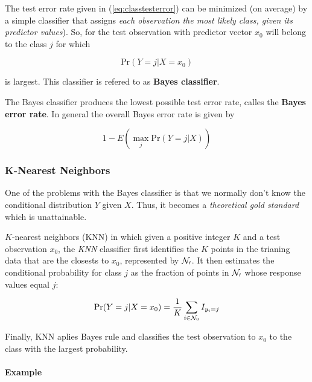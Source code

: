 \documentclass[11pt]{article}
\begin{document}
The test error rate given in (\ref{eq:classtesterror}) can be minimized
(on average) by a simple classifier that assigns \emph{each observation
the most likely class, given its predictor values}). So, for the test
observation with predictor vector \(x_0\) will belong to the class \(j\)
for which

\begin{equation*}
\mathrm{Pr}(Y=j | X=x_0)
\end{equation*}

is largest. This classifier is refered to as \textbf{Bayes classifier}.

The Bayes classifier produces the lowest possible test error rate,
calles the \textbf{Bayes error rate}. In general the overall Bayes error
rate is given by

\begin{equation*}
1 - E \left( \max_{j} \mathrm{Pr}(Y=j|X) \right)
\end{equation*}

\hypertarget{k-nearest-neighbors}{%
\subsubsection{K-Nearest Neighbors}\label{k-nearest-neighbors}}

One of the problems with the Bayes classifier is that we normally don't
know the conditional distribution \(Y\) given \(X\). Thus, it becomes a
\emph{theoretical gold standard} which is unattainable.

\(K\)-nearest neighbors (KNN) in which given a positive integer \(K\)
and a test observation \(x_0\), the \emph{KNN} classifier first
identifies the \(K\) points in the trianing data that are the closests
to \(x_0\), represented by \(\cal{N}_0\). It then estimates the
conditional probability for class \(j\) as the fraction of points in
\(\cal{N}_0\) whose response values equal \(j\):

\begin{equation*}
\mathrm{Pr}(Y=j | X=x_0) = \frac{1}{K} \sum_{i \in {\cal N}_0} I_{y_i=j}
\end{equation*}

Finally, KNN aplies Bayes rule and classifies the test observation to
\(x_0\) to the class with the largest probability.

    \hypertarget{example}{%
\paragraph{Example}\label{example}}
\end{document}
